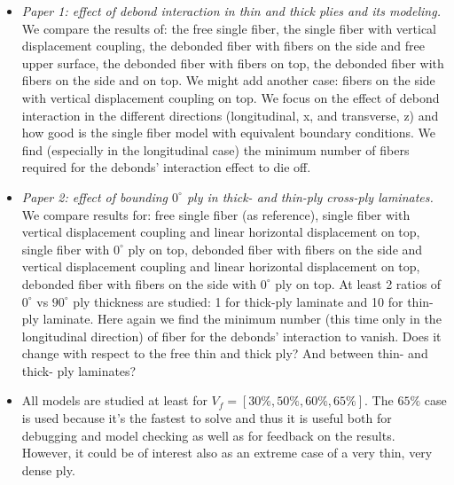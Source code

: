 \documentclass[review]{elsarticle}
\begin{document}
\begin{itemize}
\item \emph{Paper 1: effect of debond interaction in thin and thick plies and its modeling.} We compare the results of: the free single fiber, the single fiber with vertical displacement coupling, the debonded fiber with fibers on the side and free upper surface, the debonded fiber with fibers on top, the debonded fiber with fibers on the side and on top. We might add another case: fibers on the side with vertical displacement coupling on top. We focus on the effect of debond interaction in the different directions (longitudinal, x, and transverse, z) and how good is the single fiber model with equivalent boundary conditions. We find (especially in the longitudinal case) the minimum number of fibers required for the debonds' interaction effect to die off.
\item \emph{Paper 2: effect of bounding $0^{\circ}$ ply in thick- and thin-ply cross-ply laminates.} We compare results for: free single fiber (as reference), single fiber with vertical displacement coupling and linear horizontal displacement on top, single fiber with $0^{\circ}$ ply on top, debonded fiber with fibers on the side and vertical displacement coupling and linear horizontal displacement on top, debonded fiber with fibers on the side with $0^{\circ}$ ply on top. At least 2 ratios of $0^{\circ}$ vs $90^{\circ}$ ply thickness are studied: 1 for thick-ply laminate and 10 for thin-ply laminate. Here again we find the minimum number (this time only in the longitudinal direction) of fiber for the debonds' interaction to vanish. Does it change with respect to the free thin and thick ply? And between thin- and thick- ply laminates?
\item All models are studied at least for $V_{f}=\left[30\%,50\%,60\%,65\%\right]$. The $65\%$ case is used because it's the fastest to solve and thus it is useful both for debugging and model checking as well as for feedback on the results. However, it could be of interest also as an extreme case of a very thin, very dense ply.
\end{itemize}
\end{document}
